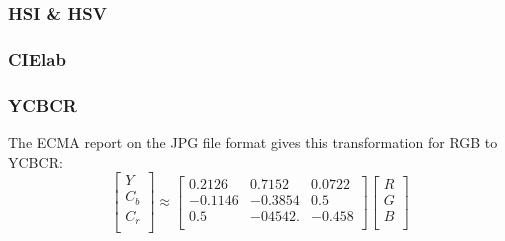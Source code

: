 \documentclass[letterpaper]{article}
\begin{document}
{\subsubsection{HSI \& HSV}
\parencite[p.~84]{Forsyth2012-hy}
\subsubsection{CIElab}
\subsubsection{YCBCR}
The ECMA report on the JPG file format gives this transformation for RGB to YCBCR:
\nocite{Ecma2019-yo}
\begin{equation}
	\begin{bmatrix}
	Y \\[0.3em]
	C_b \\[0.3em]
	C_r \\[0.3em]
	\end{bmatrix}
	\approx
	\begin{bmatrix}
	0.2126 & 0.7152 & 0.0722 \\[0.3em]
	-0.1146 & -0.3854 & 0.5 \\[0.3em]
	0.5 & -04542. & -0.458 \\[0.3em]
	\end{bmatrix}
	\begin{bmatrix}
	R \\[0.3em]
	G \\[0.3em]
	B \\[0.3em]
	\end{bmatrix}	
\end{equation}

}
\end{document}
